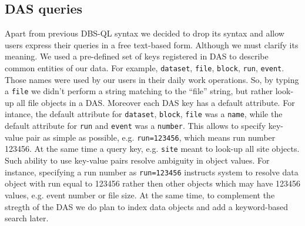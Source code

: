 \documentclass[1p,times]{elsarticle}
\begin{document}


\subsection{DAS queries}
Apart from previous DBS-QL syntax we decided to drop its syntax and allow users
express their queries in a free text-based form. Although we must clarify its
meaning. We used a pre-defined set of keys registered in DAS to describe common
entities of our data. For example, \verb+dataset+, 
\verb+file+, \verb+block+, \verb+run+, \verb+event+. Those
names were used by our users in their daily work operations. So, by typing a
\verb+file+ we didn't perform a string matching to the 
``file'' string, but rather look-up all file objects in a DAS. 
Moreover each DAS key has a default attribute.
For intance, the default attribute for
\verb+dataset+, \verb+block+, \verb+file+ 
was a \verb+name+, while the default attribute for
\verb+run+ and \verb+event+ was a \verb+number+. 
This allows to specify key-value pair as simple as possible, e.g.
\verb+run=123456+, which means run number 123456. At the same time a query 
key, e.g. \verb+site+ meant to look-up all site objects. Such ability
to use key-value pairs resolve ambiguity in object values. For instance,
specifying a run number as \verb+run=123456+ instructs system to resolve
data object with run equal to 123456 rather then other objects which may have
123456 values, e.g. event number or file size. At the same time, to complement
the stregth of the DAS we do plan to index data objects and add a keyword-based 
search later.
\end{document}
